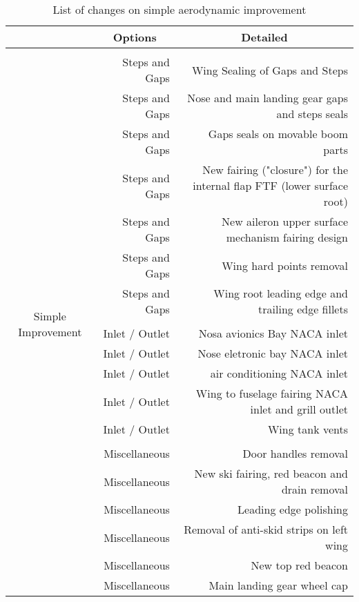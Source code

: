 \begin{table}[htbp]
  \centering
  \caption{List of changes on simple aerodynamic improvement}
    \begin{tabular}{crr}
    \toprule
    \multirow{2}[2]{*}{} & \multicolumn{1}{c}{\multirow{2}[2]{*}{Options}} & \multicolumn{1}{c}{\multirow{2}[2]{*}{Detailed}} \\
    \midrule
          & \multicolumn{1}{c}{} & \multicolumn{1}{c}{} \\
    \multirow{21}[42]{*}{Simple Improvement} & Steps and Gaps & Wing Sealing of Gaps and Steps \\
          & Steps and Gaps & Nose and main landing gear gaps and steps seals \\
          & Steps and Gaps & Gaps seals on movable boom parts \\
          & Steps and Gaps & New fairing ("closure") for the internal flap FTF (lower surface root) \\
          & Steps and Gaps & New aileron upper surface mechanism fairing design \\
          & Steps and Gaps & Wing hard points removal \\
          & Steps and Gaps & Wing root leading edge and trailing edge fillets \\
          &       &  \\
          & Inlet / Outlet & Nosa avionics Bay NACA inlet \\
          & Inlet / Outlet & Nose eletronic bay NACA inlet \\
          & Inlet / Outlet & air conditioning NACA inlet \\
          & Inlet / Outlet & Wing to fuselage fairing NACA inlet and grill outlet \\
          & Inlet / Outlet & Wing tank vents \\
          &       &  \\
          & Miscellaneous & Door handles removal \\
          & Miscellaneous & New ski fairing, red beacon and drain removal \\
          & Miscellaneous & Leading edge polishing \\
          & Miscellaneous & Removal of anti-skid strips on left wing \\
          & Miscellaneous & New top red beacon \\
          & Miscellaneous & Main landing gear wheel cap \\

\end{tabular}
\end{table}
